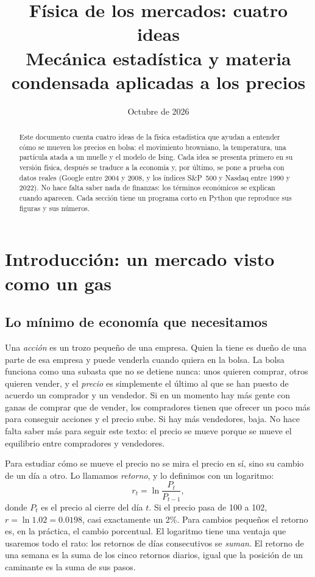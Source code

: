 \documentclass[11pt,a4paper]{article}
\title{\textbf{Física de los mercados: cuatro ideas}\\[0.4em]
\large Mecánica estadística y materia condensada aplicadas a los precios}
\author{\autor}
\date{Octubre de 2026}
\begin{document}
\maketitle

\begin{abstract}
\noindent Este documento cuenta cuatro ideas de la física estadística que ayudan a entender cómo se
mueven los precios en bolsa: el movimiento browniano, la temperatura, una partícula atada a un muelle y el
modelo de Ising. Cada idea se presenta primero en su versión física, después se traduce a la economía y,
por último, se pone a prueba con datos reales (Google entre 2004 y 2008, y los índices S\&P~500 y Nasdaq
entre 1990 y 2022). No hace falta saber nada de finanzas: los términos económicos se explican cuando
aparecen. Cada sección tiene un programa corto en Python que reproduce sus figuras y sus números.
\end{abstract}

\tableofcontents

\section{Introducción: un mercado visto como un gas}

\subsection{Lo mínimo de economía que necesitamos}

Una \emph{acción} es un trozo pequeño de una empresa. Quien la tiene es dueño de una parte de esa empresa
y puede venderla cuando quiera en la bolsa. La bolsa funciona como una subasta que no se detiene nunca:
unos quieren comprar, otros quieren vender, y el \emph{precio} es simplemente el último al que se han
puesto de acuerdo un comprador y un vendedor. Si en un momento hay más gente con ganas de comprar que de
vender, los compradores tienen que ofrecer un poco más para conseguir acciones y el precio sube. Si hay más
vendedores, baja. No hace falta saber más para seguir este texto: el precio se mueve porque se mueve el
equilibrio entre compradores y vendedores.

Para estudiar cómo se mueve el precio no se mira el precio en sí, sino su cambio de un día a otro. Lo
llamamos \emph{retorno}, y lo definimos con un logaritmo:
\begin{equation}
r_t=\ln\frac{P_t}{P_{t-1}} ,
\end{equation}
donde $P_t$ es el precio al cierre del día $t$. Si el precio pasa de 100 a 102, $r=\ln1.02=0.0198$, casi
exactamente un 2\%. Para cambios pequeños el retorno es, en la práctica, el cambio porcentual. El
logaritmo tiene una ventaja que usaremos todo el rato: los retornos de días consecutivos se \emph{suman}.
El retorno de una semana es la suma de los cinco retornos diarios, igual que la posición de un caminante es
la suma de sus pasos.
\end{document}
